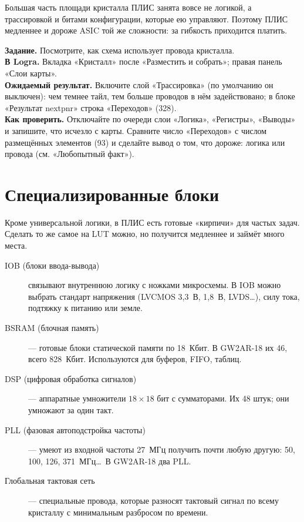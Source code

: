 \begin{infobox}
Большая часть площади кристалла ПЛИС занята вовсе не логикой, а
трассировкой и битами конфигурации, которые ею управляют. Поэтому ПЛИС
медленнее и дороже ASIC той же сложности: за гибкость приходится платить.
\end{infobox}

\begin{diybox}
\textbf{Задание.} Посмотрите, как схема использует провода кристалла.\\
\textbf{В Logra.} Вкладка «Кристалл» после «Разместить и собрать»; правая панель «Слои карты».\\
\textbf{Ожидаемый результат.} Включите слой «Трассировка» (по умолчанию он выключен): чем темнее тайл, тем больше проводов в нём задействовано; в блоке «Результат nextpnr» строка «Переходов» (328).\\
\textbf{Как проверить.} Отключайте по очереди слои «Логика», «Регистры», «Выводы» и запишите, что исчезло с карты.  Сравните число «Переходов» с числом размещённых элементов (93) и сделайте вывод о том, что дороже: логика или провода (см. «Любопытный факт»).
\end{diybox}

\section{Специализированные блоки}

Кроме универсальной логики, в ПЛИС есть готовые «кирпичи» для частых задач.
Сделать то же самое на LUT можно, но получится медленнее и займёт много места.

\begin{description}
  \item[IOB (блоки ввода-вывода)] связывают внутреннюю логику с ножками
    микросхемы. В IOB можно выбрать стандарт напряжения (LVCMOS 3,3~В,
    1,8~В, LVDS\ldots), силу тока, подтяжку к питанию или земле.
  \item[BSRAM (блочная память)] --- готовые блоки статической памяти по 18~Кбит.
    В GW2AR-18 их 46, всего 828~Кбит. Используются для буферов, FIFO, таблиц.
  \item[DSP (цифровая обработка сигналов)] --- аппаратные умножители
    $18\times18$ бит с сумматорами. Их 48 штук; они умножают за один такт.
  \item[PLL (фазовая автоподстройка частоты)] --- умеют из входной частоты
    27~МГц получить почти любую другую: 50, 100, 126, 371~МГц\ldots\
    В GW2AR-18 два PLL.
  \item[Глобальная тактовая сеть] --- специальные провода, которые разносят
    тактовый сигнал по всему кристаллу с минимальным разбросом по времени.
\end{description}

